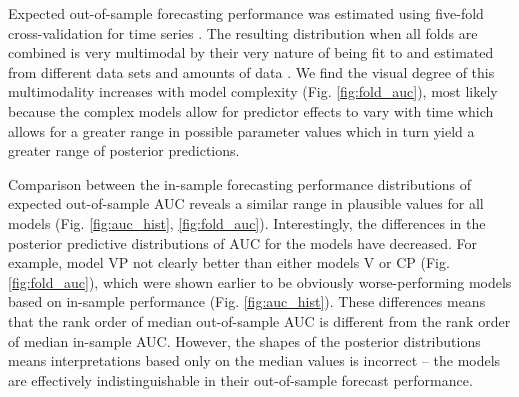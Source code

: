 \documentclass[12pt,letterpaper]{article}
\begin{document}
\begin{refsection}
Expected out-of-sample forecasting performance was estimated using five-fold cross-validation for time series \citep{Arlot2010,Bergmeir2016}. The resulting distribution when all folds are combined is very multimodal by their very nature of being fit to and estimated from different data sets and amounts of data \citep{ESL}. We find the visual degree of this multimodality increases with model complexity (Fig. \ref{fig:fold_auc}), most likely because the complex models allow for predictor effects to vary with time which allows for a greater range in possible parameter values which in turn yield a greater range of posterior predictions.

Comparison between the in-sample forecasting performance distributions of expected out-of-sample AUC reveals a similar range in plausible values for all models (Fig. \ref{fig:auc_hist}, \ref{fig:fold_auc}). Interestingly, the differences in the posterior predictive distributions of AUC for the models have decreased. For example, model VP not clearly better than either models V or CP (Fig. \ref{fig:fold_auc}), which were shown earlier to be obviously worse-performing models based on in-sample performance (Fig. \ref{fig:auc_hist}). These differences means that the rank order of median out-of-sample AUC is different from the rank order of median in-sample AUC. However, the shapes of the posterior distributions means interpretations based only on the median values is incorrect -- the models are effectively indistinguishable in their out-of-sample forecast performance.



\end{refsection}
\end{document}
